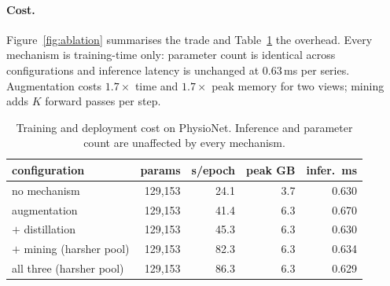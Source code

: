 \paragraph{Cost.}
Figure~\ref{fig:ablation} summarises the trade and Table~\ref{tab:cost} the overhead. Every mechanism is
training-time only: parameter count is identical
across configurations and inference latency is unchanged at $0.63$\,ms per series. Augmentation costs
$1.7\times$ time and $1.7\times$ peak memory for two views; mining adds $K$ forward passes per step.

\begin{table}[t]
\caption{Training and deployment cost on PhysioNet\prelim. Inference and parameter count are unaffected by
every mechanism.}
\label{tab:cost}
\small
\begin{tabular}{lrrrr}
\toprule
configuration & params & s/epoch & peak GB & infer.\ ms \\
\midrule
no mechanism & 129{,}153 & 24.1 & 3.7 & 0.630 \\
augmentation & 129{,}153 & 41.4 & 6.3 & 0.670 \\
$+$ distillation & 129{,}153 & 45.3 & 6.3 & 0.630 \\
$+$ mining (harsher pool) & 129{,}153 & 82.3 & 6.3 & 0.634 \\
all three (harsher pool) & 129{,}153 & 86.3 & 6.3 & 0.629 \\
\bottomrule
\end{tabular}
\end{table}
